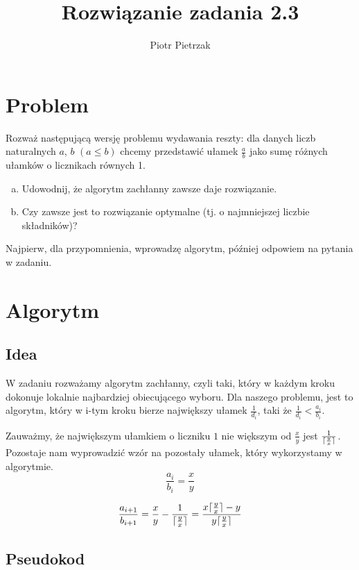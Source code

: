 \documentclass[a4paper]{article}
\title{Rozwiązanie zadania 2.3}
\author{Piotr Pietrzak}
\DeclarePairedDelimiter\ceil{\lceil}{\rceil}
\begin{document}
\maketitle

\tableofcontents

\section{Problem}

Rozważ następującą wersję problemu wydawania reszty: dla danych liczb naturalnych $a$, $b$ $(a \leq b)$ chcemy przedstawić ułamek $\frac{a}{b}$ jako sumę różnych ułamków o licznikach równych 1.

\begin{enumerate}[a)]
\item Udowodnij, że algorytm zachłanny zawsze daje rozwiązanie.
\item Czy zawsze jest to rozwiązanie optymalne (tj. o najmniejszej liczbie składników)?
\end{enumerate}

Najpierw, dla przypomnienia, wprowadzę algorytm, później odpowiem na pytania w zadaniu.

\section{Algorytm}

\subsection{Idea}

W zadaniu rozważamy algorytm zachłanny, czyli taki, który w każdym kroku dokonuje lokalnie najbardziej obiecującego wyboru. Dla naszego problemu, jest to algorytm, który w i-tym kroku bierze największy ułamek $\frac{1}{d_{i}}$, taki że $\frac{1}{d_{i}} < \frac{a_{i}}{b_{i}}$.

Zauważmy, że największym ułamkiem o liczniku $1$ nie większym od $\frac{x}{y}$ jest $\frac{1}{\ceil{\frac{y}{x}}}$. Pozostaje nam wyprowadzić wzór na pozostały ułamek, który wykorzystamy w algorytmie.
$$
	\frac{a_{i}}{b_{i}} = \frac{x}{y}
$$

$$
	\frac{a_{i + 1}}{b_{i + 1}} =
    \frac{x}{y} - \frac{1}{\ceil{\frac{y}{x}}} = \frac{
    	x\ceil{\frac{y}{x}} - y
    }{
    	y\ceil{\frac{y}{x}}
    }
$$

\subsection{Pseudokod}
\end{document}
